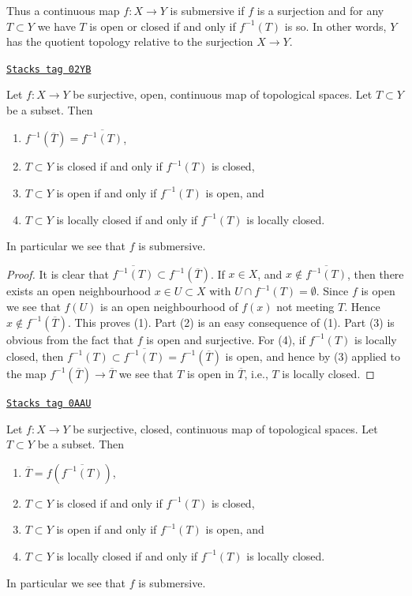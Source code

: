 Thus a continuous map $f : X \to Y$ is submersive if $f$
is a surjection and for any $T \subset Y$ we have
$T$ is open or closed if and only if $f^{-1}(T)$ is so.
In other words, $Y$ has the
quotient topology relative to the surjection $X \to Y$.

\begin{lemma}
\label{topology-lemma-open-morphism-quotient-topology}
\href{https://stacks.math.columbia.edu/tag/02YB}{\texttt{Stacks tag 02YB}}

Let $f : X \to Y$ be surjective, open, continuous map of topological spaces.
Let $T \subset Y$ be a subset. Then
\begin{enumerate}
\item $f^{-1}(\overline{T}) = \overline{f^{-1}(T)}$,
\item $T \subset Y$ is closed if and only if $f^{-1}(T)$ is closed,
\item $T \subset Y$ is open if and only if $f^{-1}(T)$ is open, and
\item $T \subset Y$ is locally closed if and only if $f^{-1}(T)$
is locally closed.
\end{enumerate}
In particular we see that $f$ is submersive.
\end{lemma}

\begin{proof}
It is clear that $\overline{f^{-1}(T)} \subset f^{-1}(\overline{T})$.
If $x \in X$, and $x \not \in \overline{f^{-1}(T)}$, then there
exists an open neighbourhood $x \in U \subset X$ with
$U \cap f^{-1}(T) = \emptyset$. Since $f$ is open we see that
$f(U)$ is an open neighbourhood of $f(x)$ not meeting $T$.
Hence $x \not \in f^{-1}(\overline{T})$. This proves (1).
Part (2) is an easy consequence of (1).
Part (3) is obvious from the fact that $f$ is open and surjective.
For (4), if $f^{-1}(T)$ is locally closed, then
$f^{-1}(T) \subset \overline{f^{-1}(T)} = f^{-1}(\overline{T})$
is open, and hence by (3) applied to the map
$f^{-1}(\overline{T}) \to \overline{T}$ we see that
$T$ is open in $\overline{T}$, i.e., $T$ is locally closed.
\end{proof}

\begin{lemma}
\label{topology-lemma-closed-morphism-quotient-topology}
\href{https://stacks.math.columbia.edu/tag/0AAU}{\texttt{Stacks tag 0AAU}}

Let $f : X \to Y$ be surjective, closed, continuous map of topological spaces.
Let $T \subset Y$ be a subset. Then
\begin{enumerate}
\item $\overline{T} = f(\overline{f^{-1}(T)})$,
\item $T \subset Y$ is closed if and only if $f^{-1}(T)$ is closed,
\item $T \subset Y$ is open if and only if $f^{-1}(T)$ is open, and
\item $T \subset Y$ is locally closed if and only if
$f^{-1}(T)$ is locally closed.
\end{enumerate}
In particular we see that $f$ is submersive.
\end{lemma}

